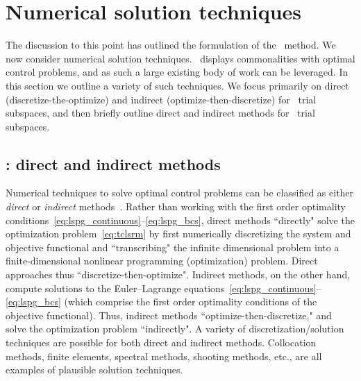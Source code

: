 \section{Numerical solution techniques}\label{sec:numerical_techniques}
The discussion to this point has outlined the formulation of the \methodAcronym\ method. We now consider numerical solution techniques. 
\methodAcronym\ displays commonalities with optimal
control problems, and as such a large existing body of work can be leveraged. In this section we 
outline a variety of such techniques. We focus primarily on 
direct (discretize-the-optimize) and indirect (optimize-then-discretize) for \spatialAcronym\ trial subspaces, 
and then briefly outline direct and indirect methods for \spaceTimeAcronym\ trial subspaces. 

\subsection{\spatialAcronym: direct and indirect methods}
Numerical techniques to
solve optimal control problems can be classified as either
\textit{direct} or \textit{indirect}
methods~\cite{conway_optimalcontrolreview}. Rather than working with the first order optimality conditions~\eqref{eq:lspg_continuous}--\eqref{eq:lspg_bcs}, direct methods ``directly" solve the optimization problem~\eqref{eq:tclsrm} by first
numerically discretizing the system and objective functional and ``transcribing"
the infinite dimensional problem into a finite-dimensional nonlinear
programming (optimization) problem. Direct approaches thus ``discretize-then-optimize".
Indirect methods, on the other hand, compute solutions to the Euler--Lagrange equations~\eqref{eq:lspg_continuous}--\eqref{eq:lspg_bcs} (which comprise the first order optimality conditions of the objective functional). Thus, indirect methods ``optimize-then-discretize," and solve the optimization problem
``indirectly". A variety of discretization/solution techniques are possible for both direct and indirect methods. Collocation methods,
finite elements, spectral methods, shooting methods, etc., are all examples of
plausible solution techniques.  

